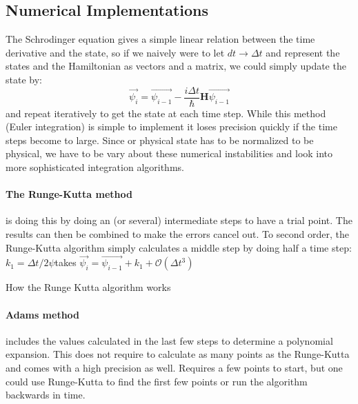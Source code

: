 \subsection{Numerical Implementations}\label{sec:numerical_implementations}
The Schrodinger equation gives a simple linear relation between the time derivative and the state, so if we naively were to let $dt\to\Delta t$ and represent the states and the Hamiltonian as vectors and a matrix, we could simply update the state by:
\begin{equation}
    \Vec{\psi_i} =  \Vec{\psi_{i-1}} - \frac{i\Delta t}{\hbar}\boldsymbol{H} \Vec{\psi_{i - 1}}
\end{equation}
and repeat iteratively to get the state at each time step. While this method (Euler integration) is simple to implement it loses precision quickly if the time steps become to large. Since or physical state has to be normalized to be physical, we have to be vary about these numerical instabilities and look into more sophisticated integration algorithms.


\paragraph{The Runge-Kutta method} is doing this by doing an (or several) intermediate steps to have a trial point. The results can then be combined to make the errors cancel out. To second order, the Runge-Kutta algorithm simply calculates a middle step by doing half a time step: $k_1 = \Delta t / 2 \psi $takes $\Vec{\psi_i} = \Vec{\psi_{i-1}} + k_1 + \mathcal{O}(\Delta t^3)$

\begin{marginfigure}
    \centering
    \caption{How the Runge Kutta algorithm works}
    \label{fig:Runge-Kutta}
\end{marginfigure}

\paragraph{Adams method} includes the values calculated in the last few steps to determine a polynomial expansion. This does not require to calculate as many points as the Runge-Kutta and comes with a high precision as well. Requires a few points to start, but one could use Runge-Kutta to find the first few points or run the algorithm backwards in time. 

